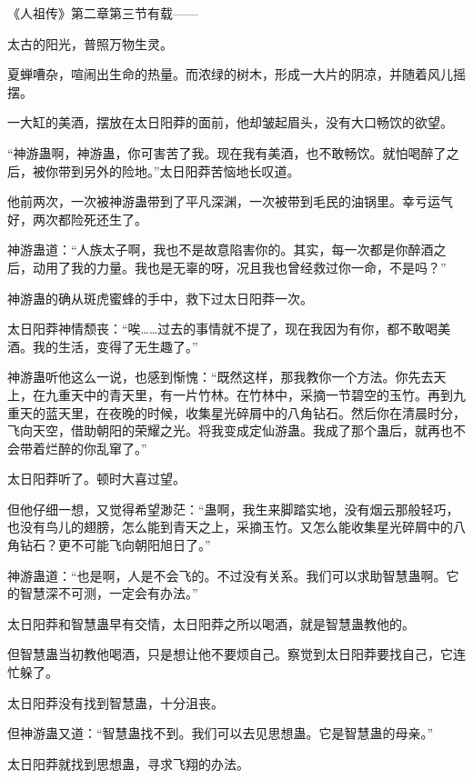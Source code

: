 
\begin{this_body}

《人祖传》第二章第三节有载——

太古的阳光，普照万物生灵。

夏蝉嘈杂，喧闹出生命的热量。而浓绿的树木，形成一大片的阴凉，并随着风儿摇摆。

一大缸的美酒，摆放在太日阳莽的面前，他却皱起眉头，没有大口畅饮的欲望。

“神游蛊啊，神游蛊，你可害苦了我。现在我有美酒，也不敢畅饮。就怕喝醉了之后，被你带到另外的险地。”太日阳莽苦恼地长叹道。

他前两次，一次被神游蛊带到了平凡深渊，一次被带到毛民的油锅里。幸亏运气好，两次都险死还生了。

神游蛊道：“人族太子啊，我也不是故意陷害你的。其实，每一次都是你醉酒之后，动用了我的力量。我也是无辜的呀，况且我也曾经救过你一命，不是吗？”

神游蛊的确从斑虎蜜蜂的手中，救下过太日阳莽一次。

太日阳莽神情颓丧：“唉……过去的事情就不提了，现在我因为有你，都不敢喝美酒。我的生活，变得了无生趣了。”

神游蛊听他这么一说，也感到惭愧：“既然这样，那我教你一个方法。你先去天上，在九重天中的青天里，有一片竹林。在竹林中，采摘一节碧空的玉竹。再到九重天的蓝天里，在夜晚的时候，收集星光碎屑中的八角钻石。然后你在清晨时分，飞向天空，借助朝阳的荣耀之光。将我变成定仙游蛊。我成了那个蛊后，就再也不会带着烂醉的你乱窜了。”

太日阳莽听了。顿时大喜过望。

但他仔细一想，又觉得希望渺茫：“蛊啊，我生来脚踏实地，没有烟云那般轻巧，也没有鸟儿的翅膀，怎么能到青天之上，采摘玉竹。又怎么能收集星光碎屑中的八角钻石？更不可能飞向朝阳旭日了。”

神游蛊道：“也是啊，人是不会飞的。不过没有关系。我们可以求助智慧蛊啊。它的智慧深不可测，一定会有办法。”

太日阳莽和智慧蛊早有交情，太日阳莽之所以喝酒，就是智慧蛊教他的。

但智慧蛊当初教他喝酒，只是想让他不要烦自己。察觉到太日阳莽要找自己，它连忙躲了。

太日阳莽没有找到智慧蛊，十分沮丧。

但神游蛊又道：“智慧蛊找不到。我们可以去见思想蛊。它是智慧蛊的母亲。”

太日阳莽就找到思想蛊，寻求飞翔的办法。


\end{this_body}
